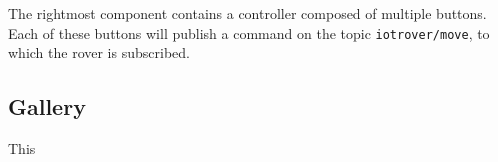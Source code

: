 
The rightmost component contains a controller composed of multiple buttons. Each of these buttons will publish a command on the topic \lstinline|iotrover/move|, to which the rover is subscribed.

\subsection{Gallery}
This 